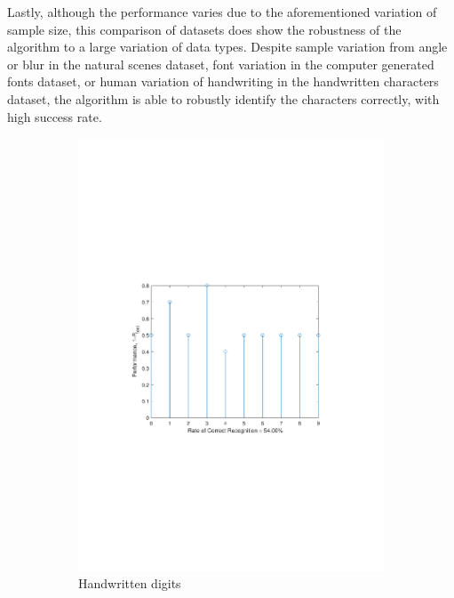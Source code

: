 \documentclass[journal,a4paper,onecolumn,11pt]{IEEEtran}
\begin{document}
Lastly, although the performance varies due to the aforementioned variation of sample size, this comparison of datasets does show the robustness of the algorithm to a large variation of data types. Despite sample variation from angle or blur in the natural scenes dataset, font variation in the computer generated fonts dataset, or human variation of handwriting in the handwritten characters dataset, the algorithm is able to robustly identify the characters correctly, with high success rate.
\begin{figure}[!h] 
	\centering
	\begin{subfigure}{.5\textwidth}
		\centering
		\includegraphics[clip, trim=0cm .25cm 0cm .4cm, width=\textwidth]{performance_digit_sm.pdf} %
		\caption{Handwritten digits}
		\label{fig:performance_digit_sm}
	\end{subfigure}%
	\begin{subfigure}{.5\textwidth}

\end{subfigure}
\end{figure}
\end{document}
